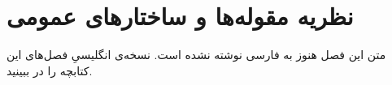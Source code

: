 \chapter{نظریه مقوله‌ها و ساختارهای عمومی}
\label{ch:13-category-theory-and-universal-structures-fa-01}

متن این فصل هنوز به فارسی نوشته نشده است. نسخه‌ی انگلیسیِ فصل‌های این کتابچه را در  ببینید.
